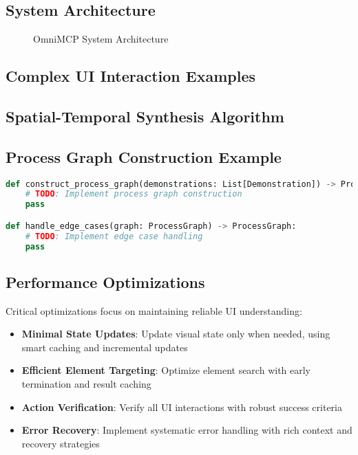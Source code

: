 \documentclass{article}
\begin{document}
\subsection{System Architecture}
\begin{figure}[h]
\centering
\caption{OmniMCP System Architecture}
\label{fig:architecture}
\end{figure}

\subsection{Complex UI Interaction Examples}

\subsection{Spatial-Temporal Synthesis Algorithm}

\subsection{Process Graph Construction Example}
\begin{lstlisting}[language=Python]
def construct_process_graph(demonstrations: List[Demonstration]) -> ProcessGraph:
    # TODO: Implement process graph construction
    pass

def handle_edge_cases(graph: ProcessGraph) -> ProcessGraph:
    # TODO: Implement edge case handling
    pass
\end{lstlisting}

\subsection{Performance Optimizations}
Critical optimizations focus on maintaining reliable UI understanding:

\begin{itemize}
    \item \textbf{Minimal State Updates}: Update visual state only when needed, using smart caching and incremental updates
    \item \textbf{Efficient Element Targeting}: Optimize element search with early termination and result caching
    \item \textbf{Action Verification}: Verify all UI interactions with robust success criteria
    \item \textbf{Error Recovery}: Implement systematic error handling with rich context and recovery strategies
\end{itemize}
\end{document}
